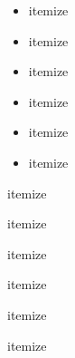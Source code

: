 \documentclass[12pt,ngerman]{scrartcl}
\begin{document}
\begin{itemize}
	\item itemize
	\item itemize
	\item itemize
	\item itemize
	\item itemize
	\item itemize
\end{itemize}

\begin{compactitem}
	\item itemize
	\item itemize
	\item itemize
	\item itemize
	\item itemize
	\item itemize
\end{compactitem}
\end{document}
